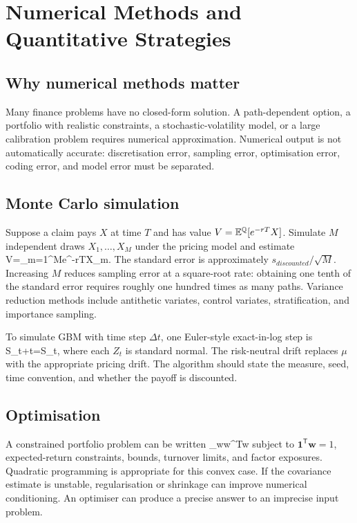 \chapter{Numerical Methods and Quantitative Strategies}

\section{Why numerical methods matter}
Many finance problems have no closed-form solution. A path-dependent option, a portfolio with realistic constraints, a stochastic-volatility model, or a large calibration problem requires numerical approximation. Numerical output is not automatically accurate: discretisation error, sampling error, optimisation error, coding error, and model error must be separated.

\section{Monte Carlo simulation}
Suppose a claim pays $X$ at time $T$ and has value $V=\mathbb{E}^{\mathbb Q}[e^{-rT}X]$. Simulate $M$ independent draws $X_1,\ldots,X_M$ under the pricing model and estimate
  \hat V=\sum_{m=1}^{M}e^{-rT}X_m.
\closeformula
The standard error is approximately $s_{discounted}/\sqrt M$. Increasing $M$ reduces sampling error at a square-root rate: obtaining one tenth of the standard error requires roughly one hundred times as many paths. Variance reduction methods include antithetic variates, control variates, stratification, and importance sampling.

To simulate GBM with time step $\Delta t$, one Euler-style exact-in-log step is
  S_{t+\Delta t}=S_t\exp{},
\closeformula
where each $Z_t$ is standard normal. The risk-neutral drift replaces $\mu$ with the appropriate pricing drift. The algorithm should state the measure, seed, time convention, and whether the payoff is discounted.

\section{Optimisation}
A constrained portfolio problem can be written
  \min_{\mathbf w}\quad \mathbf w^{\mathsf T}\boldsymbol\Sigma\mathbf w
\closeformula
subject to $\mathbf 1^{\mathsf T}\mathbf w=1$, expected-return constraints, bounds, turnover limits, and factor exposures. Quadratic programming is appropriate for this convex case. If the covariance estimate is unstable, regularisation or shrinkage can improve numerical conditioning. An optimiser can produce a precise answer to an imprecise input problem.


